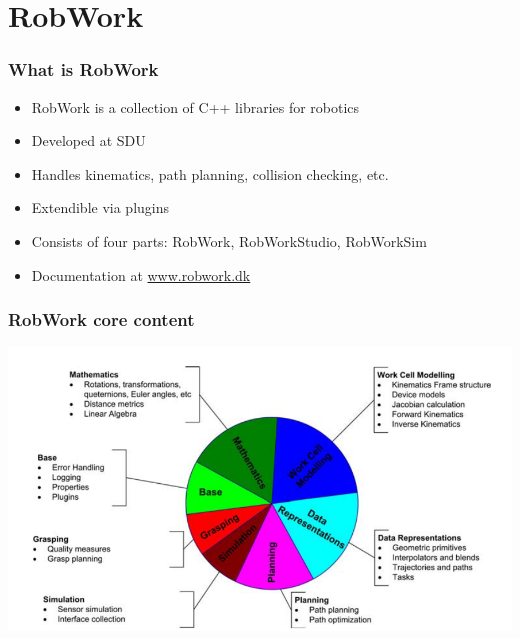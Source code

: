\documentclass{beamer}
\begin{document}

\section{RobWork}


\begin{frame}
  \frametitle{What is RobWork}
  \begin{itemize}
  \item RobWork is a collection of C++ libraries for robotics
  \item Developed at SDU
  \item Handles kinematics, path planning, collision checking, etc.
  \item Extendible via plugins
  \item Consists of four parts: RobWork, RobWorkStudio, RobWorkSim
  \item Documentation at \url{www.robwork.dk}
  \end{itemize}
\end{frame}


\begin{frame}
  \frametitle{RobWork core content}
  \includegraphics[width=\textwidth]{./graphics/robwork_core_content}
\end{frame}

\end{document}
